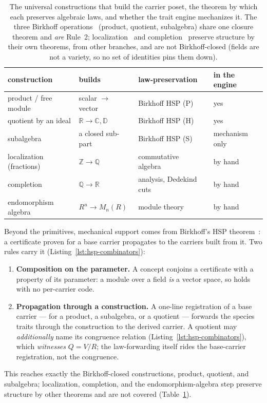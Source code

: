 \documentclass[11pt, a4paper]{article}
\begin{document}
\begin{table}[!ht]
\centering
\caption{The universal constructions that build the carrier poset, the theorem by which each preserves algebraic laws, and whether the trait engine mechanizes it.  The three Birkhoff operations~\cite{burris1981universalalgebra} (product, quotient, subalgebra) share one closure theorem and \emph{are} Rule~2; localization~\cite{atiyahmacdonald1969commutative} and completion~\cite{rudin1976principles} preserve structure by their own theorems, from other branches, and are not Birkhoff-closed (fields are not a variety, so no set of identities pins them down).}
\label{tab:constructions}
\small
\begin{tabular}{@{}l l l l@{}}
\toprule
construction & builds & law-preservation & in the engine \\
\midrule
product / free module & scalar $\to$ vector & Birkhoff HSP (P)~\cite{burris1981universalalgebra} & yes \\
quotient by an ideal & $\mathbb{R} \to \mathbb{C}, \mathbb{D}$ & Birkhoff HSP (H)~\cite{atiyahmacdonald1969commutative} & yes \\
subalgebra & a closed sub-part & Birkhoff HSP (S)~\cite{burris1981universalalgebra} & mechanism only \\
localization (fractions) & $\mathbb{Z} \to \mathbb{Q}$ & commutative algebra~\cite{atiyahmacdonald1969commutative} & by hand \\
completion & $\mathbb{Q} \to \mathbb{R}$ & analysis, Dedekind cuts~\cite{rudin1976principles} & by hand \\
endomorphism algebra & $R^n \to M_n(R)$ & module theory~\cite{lang2002algebra} & by hand \\
\bottomrule
\end{tabular}
\end{table}

Beyond the primitives, mechanical support comes from Birkhoff's HSP theorem~\cite{burris1981universalalgebra}: a certificate proven for a base carrier propagates to the carriers built from it.
Two rules carry it (Listing~\ref{lst:hsp-combinators}):
\begin{enumerate}
    \item \textbf{Composition on the parameter.}  A concept conjoins a certificate with a property of its parameter: a module over a field \emph{is} a vector space, so  holds with no per-carrier code.
    \item \textbf{Propagation through a construction.}  A one-line registration of a base carrier --- for a product, a subalgebra, or a quotient --- forwards the species traits through the construction to the derived carrier.  A quotient may \emph{additionally} name its congruence relation (Listing~\ref{lst:hsp-combinators}), which \emph{witnesses} $Q = V/R$; the law-forwarding itself rides the base-carrier registration, not the congruence.
\end{enumerate}
This reaches exactly the Birkhoff-closed constructions, product, quotient, and subalgebra; localization, completion, and the endomorphism-algebra step preserve structure by other theorems and are not covered (Table~\ref{tab:constructions}).
\end{document}
